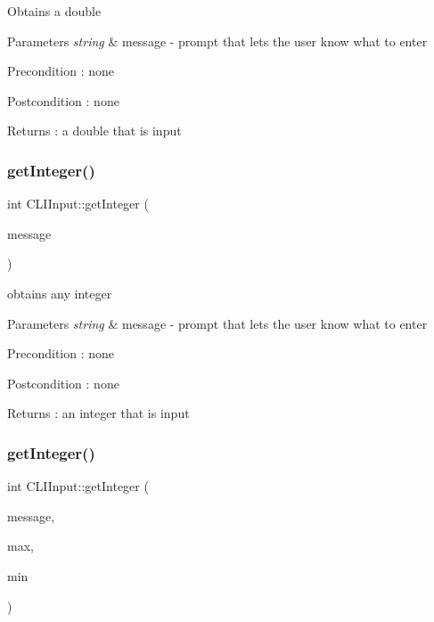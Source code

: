 Obtains a double 
\begin{DoxyParams}{Parameters}
{\em string} & message -\/ prompt that lets the user know what to enter \\
\hline
\end{DoxyParams}
\begin{DoxyPrecond}{Precondition}
\+: none 
\end{DoxyPrecond}
\begin{DoxyPostcond}{Postcondition}
\+: none 
\end{DoxyPostcond}
\begin{DoxyReturn}{Returns}
\+: a double that is input 
\end{DoxyReturn}
\mbox{\label{class_c_l_i_input_a68cd02be014eb4b3b127766ecdd0ac99}} 
\subsubsection{\texorpdfstring{get\+Integer()}{getInteger()}\hspace{0.1cm}{\footnotesize\ttfamily [1/2]}}
{\footnotesize\ttfamily int C\+L\+I\+Input\+::get\+Integer (\begin{DoxyParamCaption}\item[{string}]{message }\end{DoxyParamCaption})}

obtains any integer 
\begin{DoxyParams}{Parameters}
{\em string} & message -\/ prompt that lets the user know what to enter \\
\hline
\end{DoxyParams}
\begin{DoxyPrecond}{Precondition}
\+: none 
\end{DoxyPrecond}
\begin{DoxyPostcond}{Postcondition}
\+: none 
\end{DoxyPostcond}
\begin{DoxyReturn}{Returns}
\+: an integer that is input 
\end{DoxyReturn}
\mbox{\label{class_c_l_i_input_a078c66fb1836105f27382b4aaa58b5e4}} 
\subsubsection{\texorpdfstring{get\+Integer()}{getInteger()}\hspace{0.1cm}{\footnotesize\ttfamily [2/2]}}
{\footnotesize\ttfamily int C\+L\+I\+Input\+::get\+Integer (\begin{DoxyParamCaption}\item[{string}]{message,  }\item[{int}]{max,  }\item[{int}]{min }\end{DoxyParamCaption})}

